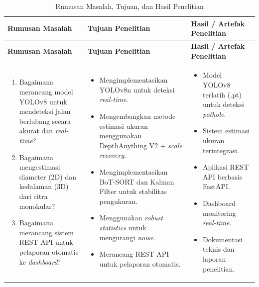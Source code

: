 \documentclass[12pt,a4paper]{article}
\newlength{\colwidth}
\begin{document}
\begin{longtable}{@{} P{\colwidth} P{\colwidth} P{\colwidth} @{}}
\caption{Rumusan Masalah, Tujuan, dan Hasil Penelitian} \\
\toprule
\textbf{Rumusan Masalah} &
\textbf{Tujuan Penelitian} &
\textbf{Hasil / Artefak Penelitian} \\
\midrule
\endfirsthead
\toprule
\textbf{Rumusan Masalah} &
\textbf{Tujuan Penelitian} &
\textbf{Hasil / Artefak Penelitian} \\
\midrule
\endhead
\bottomrule
\endfoot

\begin{enumerate}
    \item Bagaimana merancang model YOLOv8 untuk mendeteksi jalan berlubang secara akurat dan \textit{real-time}?
    \item Bagaimana mengestimasi diameter (2D) dan kedalaman (3D) dari citra monokular?
    \item Bagaimana merancang sistem REST API untuk pelaporan otomatis ke \textit{dashboard}?
\end{enumerate} &

\begin{itemize}
    \item Mengimplementasikan YOLOv8n untuk deteksi \textit{real-time}.
    \item Mengembangkan metode estimasi ukuran menggunakan DepthAnything V2 + \textit{scale recovery}.
    \item Mengimplementasikan BoT-SORT dan Kalman Filter untuk stabilitas pengukuran.
    \item Menggunakan \textit{robust statistics} untuk mengurangi \textit{noise}.
    \item Merancang REST API untuk pelaporan otomatis.
\end{itemize} &

\begin{itemize}
    \item Model YOLOv8 terlatih (.pt) untuk deteksi \textit{pothole}.
    \item Sistem estimasi ukuran terintegrasi.
    \item Aplikasi REST API berbasis FastAPI.
    \item Dashboard monitoring \textit{real-time}.
    \item Dokumentasi teknis dan laporan penelitian.
\end{itemize}

\end{longtable}
\end{document}
